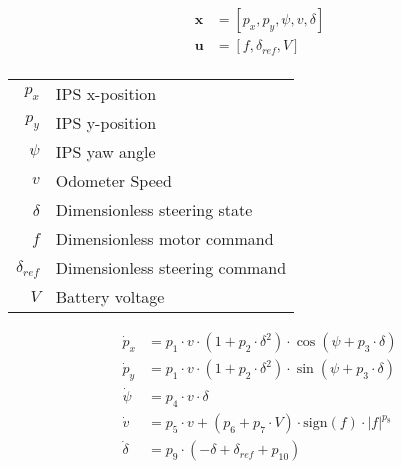 \begin{align}
\boldsymbol{x} &= [p_x, p_y, \psi, v, \delta] \\
\boldsymbol{u} &= [f, \delta_{ref}, V] \\ 
\end{align}



\begin{center}
\begin{tabular}{ r | l }
 $p_x$ & IPS x-position  \\ 
 $p_y$ & IPS y-position   \\ 
 $\psi$ & IPS yaw angle  \\ 
 $v$ & Odometer Speed  \\ 
 $\delta$ & Dimensionless steering state \\ 
 $f$ & Dimensionless motor command  \\ 
 $\delta_{ref}$ & Dimensionless steering command  \\ 
 $V$ & Battery voltage  \\ 
\end{tabular}
\end{center}


\begin{align}
\dot{p}_x &= p_1 \cdot v \cdot (1+p_2 \cdot \delta^2) \cdot \cos(\psi + p_3 \cdot \delta) \\
\dot{p}_y &= p_1 \cdot v \cdot (1+p_2 \cdot \delta^2) \cdot \sin(\psi + p_3 \cdot \delta) \\
\dot{\psi} &= p_4 \cdot v \cdot \delta \\
\dot{v} &= p_5 \cdot v + (p_6 + p_7 \cdot V) \cdot \text{sign}(f) \cdot |f|^{p_8} \\
\dot{\delta} &= p_9 \cdot (-\delta + \delta_{ref} + p_{10})
\end{align}